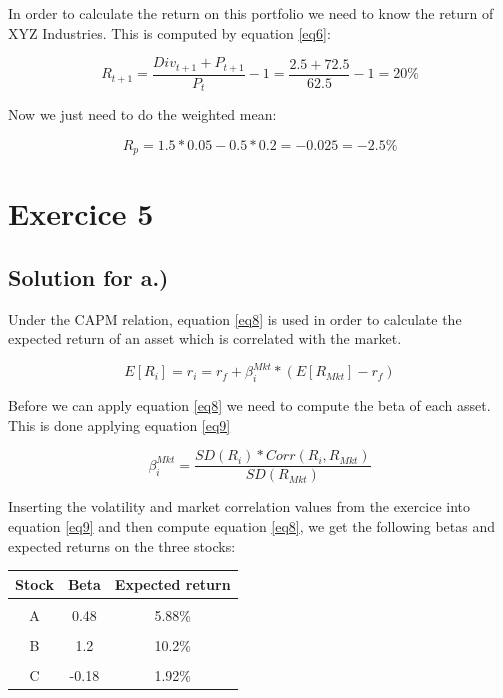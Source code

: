 \documentclass[a4paper,11pt,twoside]{article}
\begin{document}
In order to calculate the return on this portfolio we need to know the return of XYZ Industries. This is computed by equation \ref{eq6}:

\begin{equation}
\label{eq6}
R_{t+1} = \frac{Div_{t+1} + P_{t+1}}{P_t} - 1 = \frac{2.5 + 72.5}{62.5} - 1 = 20\% 
\end{equation}

Now we just need to do the weighted mean: 

\begin{equation}
\label{eq7}
R_p = 1.5*0.05-0.5*0.2 = -0.025 = -2.5\%
\end{equation}


\section{Exercice 5}

\subsection{Solution for a.)}
Under the CAPM relation, equation \ref{eq8} is used in order to calculate the expected return of an asset which is correlated with the market.

\begin{equation}
\label{eq8}
E[R_i] = r_i = r_f + \beta_i^{Mkt}*(E[R_{Mkt}]-r_f)
\end{equation}

Before we can apply equation \ref{eq8} we need to compute the beta of each asset. This is done applying equation \ref{eq9}

\begin{equation}
\label{eq9}
\beta_i^{Mkt} = \frac{SD(R_i)*Corr(R_i,R_{Mkt})}{SD(R_{Mkt})}
\end{equation}

Inserting the volatility and market correlation values from the exercice into equation \ref{eq9} and then compute equation \ref{eq8}, we get the following betas and expected returns on the three stocks:

\begin{center} %
\begin{tabular} { c  c  c}
Stock & Beta & Expected return\\[5pt]
\hline \\[-5pt]
A & 0.48 & 5.88\% \\[5pt]
\hline \\[-5pt]
B & 1.2 & 10.2\% \\[5pt]
\hline \\[-5pt]
C & -0.18 & 1.92\%\\[5pt]
\hline
\end{tabular}
\end{center}
\end{document}
